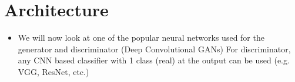 \section{Architecture}
\begin{frame}
\end{frame}

\begin{frame}
	\begin{itemize}
		\item<1-> We will now look at one of the popular neural networks used for the generator and discriminator (Deep Convolutional GANs)
		For discriminator, any CNN based classifier with 1 class (real) at the output can be used (e.g. VGG, ResNet, etc.)
	\end{itemize}
\end{frame}

